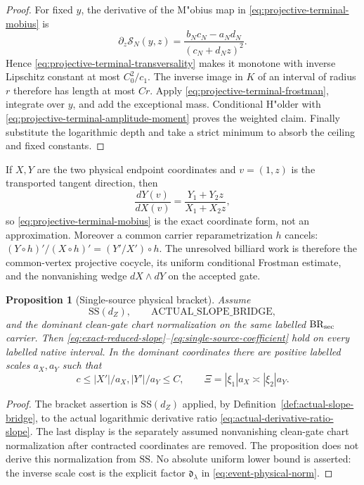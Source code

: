 \documentclass[11pt]{article}
\newtheorem{proposition}[theorem]{Proposition}
\begin{document}
\begin{proof}
For fixed $y$, the derivative of the M"obius map in
\eqref{eq:projective-terminal-mobius} is
\[
 \partial_z\mathscr S_N(y,z)
 =\frac{b_Nc_N-a_Nd_N}{(c_N+d_Nz)^2}.
\]
Hence \eqref{eq:projective-terminal-transversality} makes it monotone with
inverse Lipschitz constant at most $C_0^2/c_1$.  The inverse image in $K$
of an interval of radius $r$ therefore has length at most $Cr$.
Apply \eqref{eq:projective-terminal-frostman}, integrate over $y$, and add
the exceptional mass.  Conditional H"older with
\eqref{eq:projective-terminal-amplitude-moment} proves the weighted claim.
Finally substitute the logarithmic depth and take a strict minimum to
absorb the ceiling and fixed constants.
\end{proof}

If $X,Y$ are the two physical endpoint coordinates and $v=(1,z)$ is the
transported tangent direction, then
\[
 \frac{dY(v)}{dX(v)}
 =\frac{Y_1+Y_2z}{X_1+X_2z},
\]
so \eqref{eq:projective-terminal-mobius} is the exact coordinate form, not
an approximation.  Moreover a common carrier reparametrization $h$ cancels:
$(Y\circ h)'/(X\circ h)'=(Y'/X')\circ h$.  The unresolved billiard work is
therefore the common-vertex projective cocycle, its uniform conditional
Frostman estimate, and the nonvanishing wedge
$dX\wedge dY$ on the accepted gate.

\begin{proposition}[Single-source physical bracket]
\label{prop:exact-reduced-slope}
Assume
\[
 \mathrm{SS}(d_Z),\qquad
 \mathrm{ACTUAL\_SLOPE\_BRIDGE},
\]
and the dominant clean-gate chart normalization on the same labelled
$\mathrm{BR}_{\rm sec}$ carrier.  Then
\eqref{eq:exact-reduced-slope}--\eqref{eq:single-source-coefficient} hold on
every labelled native interval.  In the dominant coordinates there are
positive labelled scales $a_X,a_Y$ such that
\begin{equation}
\label{eq:dominant-coordinate-normalization}
 c\le |X'|/a_X,|Y'|/a_Y\le C,
 \qquad \Xi=|\xi_1|a_X\asymp|\xi_2|a_Y.
\end{equation}
\end{proposition}

\begin{proof}
The bracket assertion is $\mathrm{SS}(d_Z)$ applied, by
Definition~\ref{def:actual-slope-bridge}, to the actual logarithmic
derivative ratio \eqref{eq:actual-derivative-ratio-slope}.  The last display
is the separately assumed nonvanishing clean-gate chart normalization after
contracted coordinates are removed.  The proposition does not derive this
normalization from $\mathrm{SS}$.  No absolute uniform lower bound is
asserted: the inverse scale cost is the explicit factor
$\mathfrak d_\lambda$ in \eqref{eq:event-physical-norm}.
\end{proof}
\end{document}
